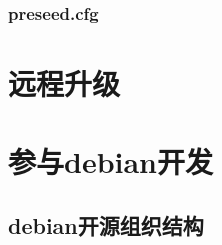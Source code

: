 \documentclass[a4paper,10pt]{article}
\begin{document}
\begin{CJK}{UTF8}{gbsn}
\section{preseed.cfg}
\subsection{}
\subsubsection{}

\part{远程升级}
\chapter{}
\section{}
\subsection{}
\subsubsection{}

\part{参与debian开发}
\chapter{debian开源组织结构}
\section{}
\subsection{}
\subsubsection{}



\end{CJK}
\end{document}

